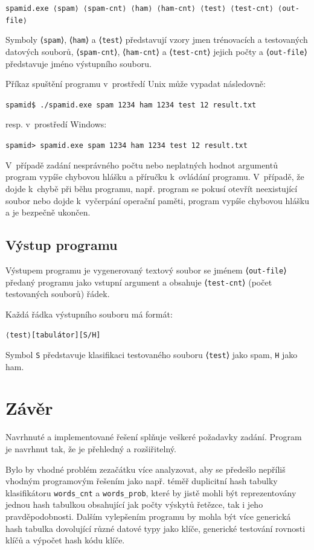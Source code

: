 \documentclass[a4paper, 12pt]{report}
\begin{document}
\texttt{spamid.exe ⟨spam⟩ ⟨spam-cnt⟩ ⟨ham⟩ ⟨ham-cnt⟩ ⟨test⟩ 
⟨test-\linebreak cnt⟩ ⟨out-file⟩}

Symboly ⟨\texttt{spam}⟩, ⟨\texttt{ham}⟩ a ⟨\texttt{test}⟩ představují 
vzory jmen trénovacích a testovaných datových souborů, 
⟨\texttt{spam-cnt}⟩, ⟨\texttt{ham-cnt}⟩ a ⟨\texttt{test-cnt}⟩ jejich počty 
a ⟨\texttt{out-file}⟩ představuje jméno výstupního souboru.

Příkaz spuštění programu v~prostředí Unix může vypadat následovně:

\texttt{spamid\$ ./spamid.exe spam 1234 ham 1234 test 12 result.txt}

resp. v~prostředí Windows:

\texttt{spamid> spamid.exe spam 1234 ham 1234 test 12 result.txt}

V~případě zadání nesprávného počtu nebo neplatných hodnot argumentů 
program vypíše chybovou hlášku a příručku k~ovládání programu. V~případě, 
že dojde k~chybě při běhu programu, např. program se pokusí otevřít 
neexistující soubor nebo dojde k~vyčerpání operační paměti, program vypíše 
chybovou hlášku a je bezpečně ukončen.

\section{Výstup programu}

Výstupem programu je vygenerovaný textový soubor se jménem 
⟨\texttt{out-file}⟩ předaný programu jako vstupní argument a obsahuje 
⟨\texttt{test-cnt}⟩ (počet testovaných souborů) řádek.

Každá řádka výstupního souboru má formát:

\texttt{⟨test⟩[tabulátor][S/H]}

Symbol \texttt{S} představuje klasifikaci testovaného souboru 
⟨\texttt{test}⟩ jako spam, \texttt{H} jako ham.

\chapter{Závěr}

Navrhnuté a implementované řešení splňuje veškeré požadavky zadání. 
Program je navrhnut tak, že je přehledný a rozšiřitelný.

Bylo by vhodné problém zezačátku více analyzovat, aby se předešlo nepříliš 
vhodným programovým řešením jako např. téměř duplicitní hash tabulky 
klasifikátoru \texttt{words\_cnt} a \texttt{words\_prob}, které by jistě 
mohli být reprezentovány jednou hash tabulkou obsahující jak počty výskytů 
řetězce, tak i jeho pravděpodobnosti. Dalším vylepšením programu by mohla
být více generická hash tabulka dovolující různé datové typy jako klíče,
generické testování rovnosti klíčů a výpočet hash kódu klíče.
\end{document}
